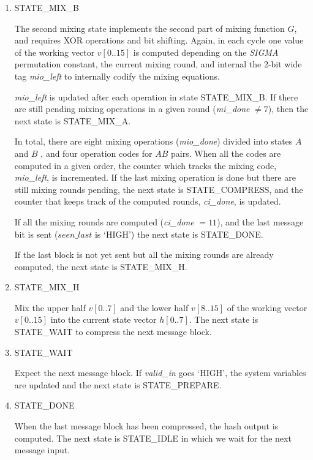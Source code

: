 \documentclass[%
	a4paper,
]
{article}
\newcommand{\done}[1]{}
\begin{document}
\begin{enumerate}
	\item STATE_MIX_B

		The second mixing state implements the second part of mixing function $G$,
		and requires XOR operations and bit shifting. Again, in each cycle
		one value of the working vector $v[0..15]$ is computed depending on the
		\emph{SIGMA} permutation constant, the current mixing round, and internal
		the 2-bit wide tag \emph{mio\_left} to internally codify the mixing equations.

		\emph{mio\_left} is updated after each operation in state
		\mbox{STATE_MIX_B}.	If there are still pending mixing operations in a given
		round	(\emph{mi_done} $\neq 7$), then the next state is \mbox{STATE_MIX_A}.

		In total, there are eight mixing operations (\emph{mio_done}) divided into
		states $A$ and $B$ \done{(Hmmm, the term ``state'' seems to be used
		ambiguously here)}, and four operation codes for $AB$
		pairs. When all the	codes are computed in a given order, the counter which
		tracks the mixing code, \emph{mio\_left}, is incremented. If the last
		mixing operation is done but there are still mixing rounds pending, the next
		state is \mbox{STATE_COMPRESS}, and the counter that keeps track of the
		computed rounds, \emph{ci_done}, is updated.

		If all the mixing rounds are computed (\emph{ci_done} $= 11$), and the
		last message bit is sent ($seen\_last$ is `HIGH') the next state is
		\mbox{STATE_DONE}.

		If the last block is not yet sent but all the mixing
		rounds are already computed, the next state is \mbox{STATE_MIX_H}.

	\item STATE_MIX_H

		Mix the upper half $v[0..7]$ and the lower half $v[8..15]$ of the working
		vector $v[0..15]$ into the current state vector $h[0..7]$. The next state
		is \mbox{STATE_WAIT} to compress the next message block.

	\item STATE_WAIT

		Expect the next message block. If \emph{valid_in} goes `HIGH', the system
		variables are updated and the next state is \mbox{STATE_PREPARE}.

	\item STATE_DONE

		When the last message block has been compressed, the hash output is computed.
		The next state is \mbox{STATE_IDLE} in which we wait for the next message
		input.

\end{enumerate}		
\end{document}
